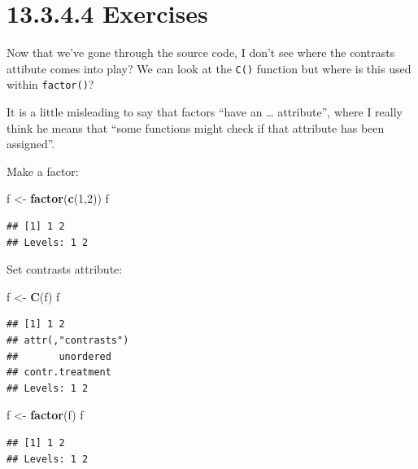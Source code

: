\documentclass[]{book}
\newenvironment{Shaded}{\begin{snugshade}}{\end{snugshade}}
\newcommand{\DecValTok}[1]{\textcolor[rgb]{0.00,0.00,0.81}{#1}}
\newcommand{\KeywordTok}[1]{\textcolor[rgb]{0.13,0.29,0.53}{\textbf{#1}}}
\newcommand{\NormalTok}[1]{#1}
\newcommand{\StringTok}[1]{\textcolor[rgb]{0.31,0.60,0.02}{#1}}
\begin{document}
\hypertarget{exercises-11}{%
\section*{13.3.4.4 Exercises}\label{exercises-11}}

Now that we've gone through the source code, I don't see where the contrasts attibute comes into play? We can look at the \texttt{C()} function but where is this used within \texttt{factor()}?

It is a little misleading to say that factors ``have an \ldots{} attribute'', where I really think he means that ``some functions might check if that attribute has been assigned''.

Make a factor:

\begin{Shaded}
\begin{Highlighting}[]
\NormalTok{f <-}\StringTok{ }\KeywordTok{factor}\NormalTok{(}\KeywordTok{c}\NormalTok{(}\DecValTok{1}\NormalTok{,}\DecValTok{2}\NormalTok{))}
\NormalTok{f}
\end{Highlighting}
\end{Shaded}

\begin{verbatim}
## [1] 1 2
## Levels: 1 2
\end{verbatim}

Set contrasts attribute:

\begin{Shaded}
\begin{Highlighting}[]
\NormalTok{f <-}\StringTok{ }\KeywordTok{C}\NormalTok{(f)}
\NormalTok{f}
\end{Highlighting}
\end{Shaded}

\begin{verbatim}
## [1] 1 2
## attr(,"contrasts")
##       unordered 
## contr.treatment 
## Levels: 1 2
\end{verbatim}

\begin{Shaded}
\begin{Highlighting}[]
\NormalTok{f <-}\StringTok{ }\KeywordTok{factor}\NormalTok{(f)}
\NormalTok{f}
\end{Highlighting}
\end{Shaded}

\begin{verbatim}
## [1] 1 2
## Levels: 1 2
\end{verbatim}
\end{document}
